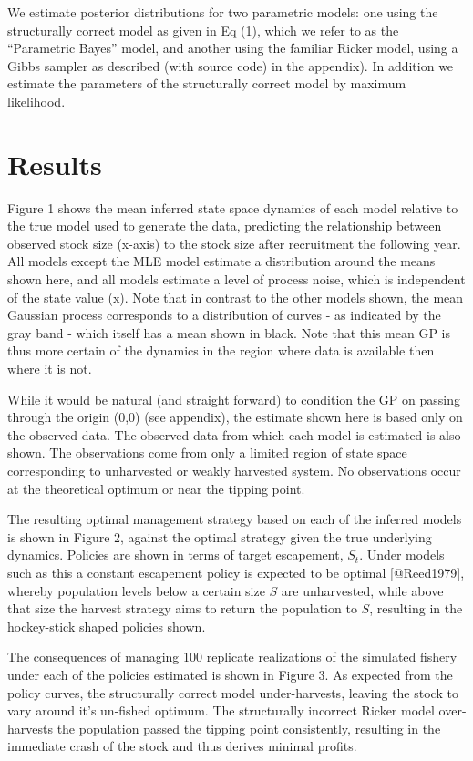 \documentclass[author-year, review]{elsarticle} %
\begin{document}
We estimate posterior distributions for two parametric models: one using
the structurally correct model as given in Eq (1), which we refer to as
the ``Parametric Bayes'' model, and another using the familiar Ricker
model, using a Gibbs sampler as described (with source code) in the
appendix). In addition we estimate the parameters of the structurally
correct model by maximum likelihood.

\section{Results}

Figure 1 shows the mean inferred state space dynamics of each model
relative to the true model used to generate the data, predicting the
relationship between observed stock size (x-axis) to the stock size
after recruitment the following year. All models except the MLE model
estimate a distribution around the means shown here, and all models
estimate a level of process noise, which is independent of the state
value (x). Note that in contrast to the other models shown, the mean
Gaussian process corresponds to a distribution of curves - as indicated
by the gray band - which itself has a mean shown in black. Note that
this mean GP is thus more certain of the dynamics in the region where
data is available then where it is not.

While it would be natural (and straight forward) to condition the GP on
passing through the origin (0,0) (see appendix), the estimate shown here
is based only on the observed data. The observed data from which each
model is estimated is also shown. The observations come from only a
limited region of state space corresponding to unharvested or weakly
harvested system. No observations occur at the theoretical optimum or
near the tipping point.

The resulting optimal management strategy based on each of the inferred
models is shown in Figure 2, against the optimal strategy given the true
underlying dynamics. Policies are shown in terms of target escapement,
$S_t$. Under models such as this a constant escapement policy is
expected to be optimal {[}@Reed1979{]}, whereby population levels below
a certain size $S$ are unharvested, while above that size the harvest
strategy aims to return the population to $S$, resulting in the
hockey-stick shaped policies shown.

The consequences of managing 100 replicate realizations of the simulated
fishery under each of the policies estimated is shown in Figure 3. As
expected from the policy curves, the structurally correct model
under-harvests, leaving the stock to vary around it's un-fished optimum.
The structurally incorrect Ricker model over-harvests the population
passed the tipping point consistently, resulting in the immediate crash
of the stock and thus derives minimal profits.
\end{document}
